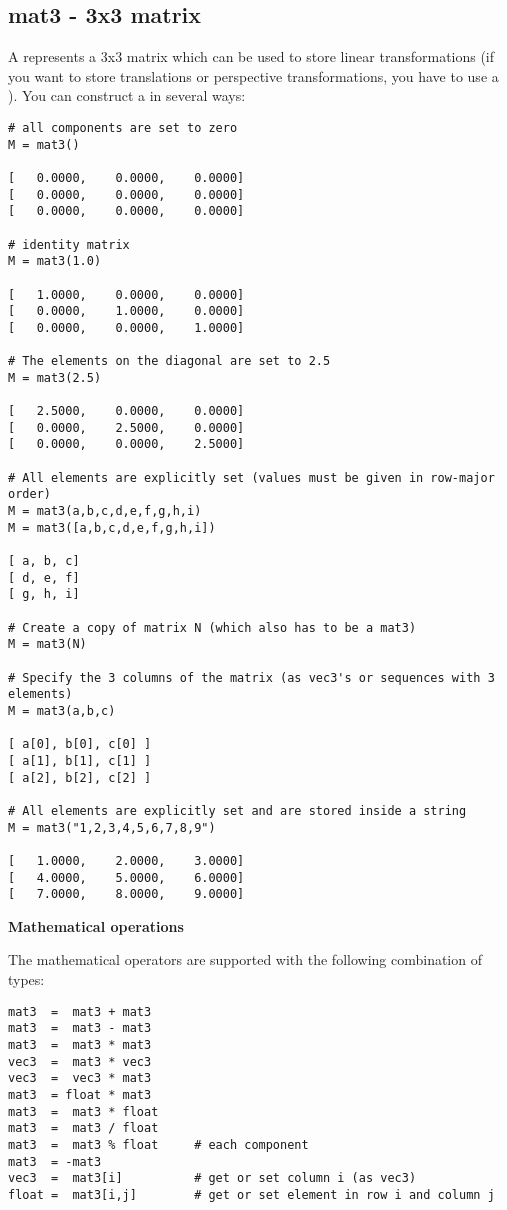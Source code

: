 \subsection{mat3 - 3x3 matrix}
\label{mat3}

A  represents a 3x3 matrix which can be used to store
linear transformations (if you want to store translations or
perspective transformations, you have to use a ). You can
construct a  in several ways:

\begin{verbatim}
# all components are set to zero
M = mat3()

[   0.0000,    0.0000,    0.0000]
[   0.0000,    0.0000,    0.0000]
[   0.0000,    0.0000,    0.0000]

# identity matrix
M = mat3(1.0)

[   1.0000,    0.0000,    0.0000]
[   0.0000,    1.0000,    0.0000]
[   0.0000,    0.0000,    1.0000]

# The elements on the diagonal are set to 2.5
M = mat3(2.5)

[   2.5000,    0.0000,    0.0000]
[   0.0000,    2.5000,    0.0000]
[   0.0000,    0.0000,    2.5000]

# All elements are explicitly set (values must be given in row-major order)
M = mat3(a,b,c,d,e,f,g,h,i)
M = mat3([a,b,c,d,e,f,g,h,i])

[ a, b, c]
[ d, e, f]
[ g, h, i]

# Create a copy of matrix N (which also has to be a mat3)
M = mat3(N)

# Specify the 3 columns of the matrix (as vec3's or sequences with 3 elements)
M = mat3(a,b,c)

[ a[0], b[0], c[0] ]
[ a[1], b[1], c[1] ]
[ a[2], b[2], c[2] ]

# All elements are explicitly set and are stored inside a string
M = mat3("1,2,3,4,5,6,7,8,9")

[   1.0000,    2.0000,    3.0000]
[   4.0000,    5.0000,    6.0000]
[   7.0000,    8.0000,    9.0000]
\end{verbatim}

{\bf Mathematical operations}

The mathematical operators are supported with the following
combination of types:

\begin{verbatim}
mat3  =  mat3 + mat3
mat3  =  mat3 - mat3
mat3  =  mat3 * mat3
vec3  =  mat3 * vec3
vec3  =  vec3 * mat3
mat3  = float * mat3
mat3  =  mat3 * float
mat3  =  mat3 / float
mat3  =  mat3 % float     # each component
mat3  = -mat3
vec3  =  mat3[i]          # get or set column i (as vec3)
float =  mat3[i,j]        # get or set element in row i and column j
\end{verbatim}

